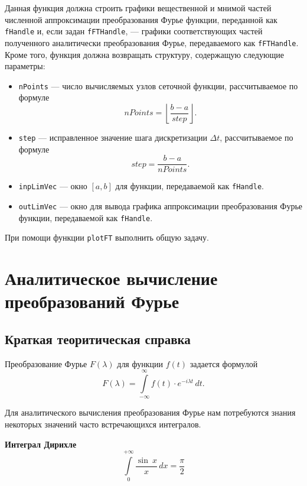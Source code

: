 \documentclass[a4paper, 11pt]{article}
\newcommand{\myint}[4]{\int\limits_{#1}^{#2}#3\,d#4}
\begin{document}
        Данная функция должна строить графики вещественной и мнимой частей численной аппроксимации преобразования Фурье функции, переданной как \texttt{fHandle} и, если задан \texttt{fFTHandle}, --- графики соответствующих частей полученного аналитически преобразования Фурье, передаваемого как \texttt{fFTHandle}. 
        Кроме того, функция должна возвращать структуру, содержащую следующие параметры:
        \begin{itemize}
            \item \texttt{nPoints} --- число вычисляемых узлов сеточной функции, рассчитываемое по формуле
                $$
                    nPoints = \left \lfloor \frac{b- a}{step} \right \rfloor.        
                $$
            \item \texttt{step} --- исправленное значение шага дискретизации $\Delta t$, рассчитываемое по формуле
                $$
                    step = \frac{b-a}{nPoints}.
                $$
            \item \texttt{inpLimVec} --- окно $[a, b]$ для функции, передаваемой как \texttt{fHandle}.
            \item \texttt{outLimVec} --- окно для вывода графика аппроксимации преобразования Фурье функции, передаваемой как \texttt{fHandle}.
        \end{itemize}          
        
        При помощи функции \texttt{plotFT} выполнить общую задачу.

\clearpage
\section{Аналитическое вычисление преобразований Фурье}
    \subsection{Краткая теоритическая справка} 
        Преобразование Фурье $F(\lambda)$ для функции $f(t)$ задается формулой
        \begin{equation} \label{eq:fourier}
            F(\lambda) = \myint{-\infty}{\infty}{f(t)\cdot e^{-i\lambda t}}{t}.
        \end{equation}       
        
        Для аналитического вычисления преобразования Фурье нам потребуются знания некоторых значений часто встречающихся интегралов.
        
        \textbf{Интеграл Дирихле}
        \begin{equation} \label{eq:Dirichlet_integral}
            \myint{0}{+\infty}{\frac{\sin \: x}{x}}{x} = \frac{\pi}{2}
        \end{equation}
        
\end{document}
